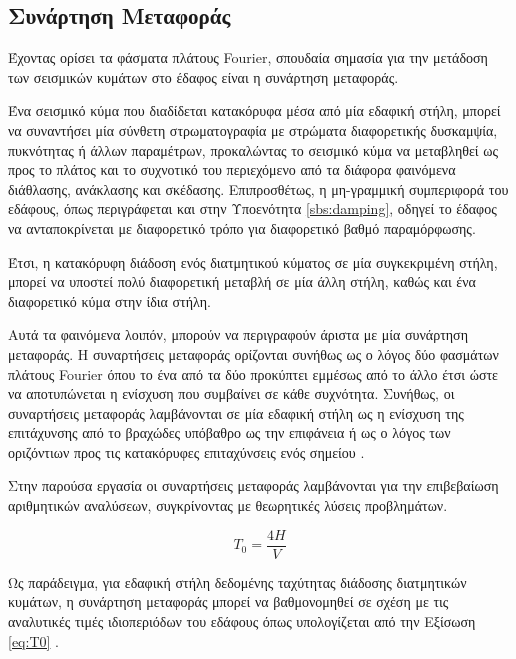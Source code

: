 \subsection{Συνάρτηση Μεταφοράς}
\label{sbs:tf}
Έχοντας ορίσει τα φάσματα πλάτους Fourier, σπουδαία σημασία για την μετάδοση των σεισμικών κυμάτων στο έδαφος είναι η συνάρτηση μεταφοράς.

Ένα σεισμικό κύμα που διαδίδεται κατακόρυφα μέσα από μία εδαφική στήλη, μπορεί να συναντήσει μία σύνθετη στρωματογραφία με στρώματα διαφορετικής δυσκαμψία, πυκνότητας ή άλλων παραμέτρων, προκαλώντας το σεισμικό κύμα να μεταβληθεί ως προς το πλάτος και το συχνοτικό του περιεχόμενο από τα διάφορα φαινόμενα διάθλασης, ανάκλασης και σκέδασης. Επιπροσθέτως, η μη-γραμμική συμπεριφορά του εδάφους, όπως περιγράφεται και στην Υποενότητα \ref{sbs:damping}, οδηγεί το έδαφος να ανταποκρίνεται με διαφορετικό τρόπο για διαφορετικό βαθμό παραμόρφωσης.

Έτσι, η κατακόρυφη διάδοση ενός διατμητικού κύματος σε μία συγκεκριμένη στήλη, μπορεί να υποστεί πολύ διαφορετική μεταβλή σε μία άλλη στήλη, καθώς και ένα διαφορετικό κύμα στην ίδια στήλη.

Αυτά τα φαινόμενα λοιπόν, μπορούν να περιγραφούν άριστα με μία συνάρτηση μεταφοράς. Η συναρτήσεις μεταφοράς ορίζονται συνήθως ως ο λόγος δύο φασμάτων πλάτους Fourier όπου το ένα από τα δύο προκύπτει εμμέσως από το άλλο έτσι ώστε να αποτυπώνεται η ενίσχυση που συμβαίνει σε κάθε συχνότητα. Συνήθως, οι συναρτήσεις μεταφοράς λαμβάνονται σε μία εδαφική στήλη ως η ενίσχυση της επιτάχυνσης από το βραχώδες υπόβαθρο ως την επιφάνεια ή ως ο λόγος των οριζόντιων προς τις κατακόρυφες επιταχύνσεις ενός σημείου \parencite{Garcia}.

Στην παρούσα εργασία οι συναρτήσεις μεταφοράς λαμβάνονται για την επιβεβαίωση αριθμητικών αναλύσεων, συγκρίνοντας με θεωρητικές λύσεις προβλημάτων.

\begin{equation}
	T_0 = \frac{4H}{V}
	\label{eq:T0}
\end{equation}

Ως παράδειγμα, για εδαφική στήλη δεδομένης ταχύτητας διάδοσης διατμητικών κυμάτων, η συνάρτηση μεταφοράς μπορεί να βαθμονομηθεί σε σχέση με τις αναλυτικές τιμές ιδιοπεριόδων του εδάφους όπως υπολογίζεται από την Εξίσωση \ref{eq:T0} \parencite{Dobry}.

